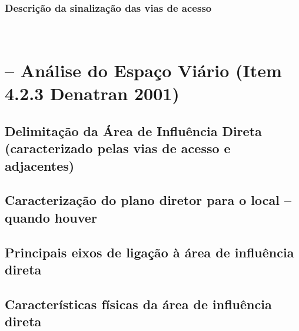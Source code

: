 \documentclass[]{article}
\begin{document}
\hypertarget{descriuxe7uxe3o-da-sinalizauxe7uxe3o-das-vias-de-acesso}{%
\subsubsection{Descrição da sinalização das vias de
acesso}\label{descriuxe7uxe3o-da-sinalizauxe7uxe3o-das-vias-de-acesso}}

~

\hypertarget{anuxe1lise-do-espauxe7o-viuxe1rio-item-4.2.3-denatran-2001}{%
\section{-- Análise do Espaço Viário (Item 4.2.3 Denatran
2001)}\label{anuxe1lise-do-espauxe7o-viuxe1rio-item-4.2.3-denatran-2001}}

\hypertarget{delimitauxe7uxe3o-da-uxe1rea-de-influuxeancia-direta-caracterizado-pelas-vias-de-acesso-e-adjacentes}{%
\subsection{Delimitação da Área de Influência Direta (caracterizado
pelas vias de acesso e
adjacentes)}\label{delimitauxe7uxe3o-da-uxe1rea-de-influuxeancia-direta-caracterizado-pelas-vias-de-acesso-e-adjacentes}}

\hypertarget{caracterizauxe7uxe3o-do-plano-diretor-para-o-local-quando-houver}{%
\subsection{Caracterização do plano diretor para o local -- quando
houver}\label{caracterizauxe7uxe3o-do-plano-diretor-para-o-local-quando-houver}}

\hypertarget{principais-eixos-de-ligauxe7uxe3o-uxe0-uxe1rea-de-influuxeancia-direta}{%
\subsection{Principais eixos de ligação à área de influência
direta}\label{principais-eixos-de-ligauxe7uxe3o-uxe0-uxe1rea-de-influuxeancia-direta}}

\hypertarget{caracteruxedsticas-fuxedsicas-da-uxe1rea-de-influuxeancia-direta}{%
\subsection{Características físicas da área de influência
direta}\label{caracteruxedsticas-fuxedsicas-da-uxe1rea-de-influuxeancia-direta}}
\end{document}

